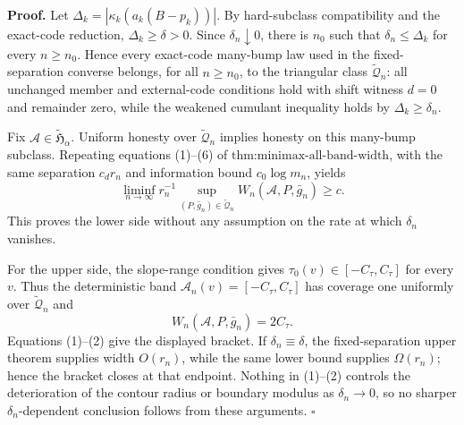 \textbf{Proof.}
Let \(\Delta_k=|\kappa_k(a_k(B-p_k))|\). By hard-subclass compatibility and the exact-code reduction, \(\Delta_k\ge\delta>0\). Since \(\delta_n\downarrow0\), there is \(n_0\) such that \(\delta_n\le\Delta_k\) for every \(n\ge n_0\). Hence every exact-code many-bump law used in the fixed-separation converse belongs, for all \(n\ge n_0\), to the triangular class \(\widetilde{\mathcal Q}_n\): all unchanged member and external-code conditions hold with shift witness \(d=0\) and remainder zero, while the weakened cumulant inequality holds by \(\Delta_k\ge\delta_n\).

Fix \(\mathcal A\in\widetilde{\mathfrak H}_\alpha\). Uniform honesty over \(\widetilde{\mathcal Q}_n\) implies honesty on this many-bump subclass. Repeating equations (1)--(6) of \(\text{thm:minimax-all-band-width}\), with the same separation \(c_dr_n\) and information bound \(c_0\log m_n\), yields
\[
 \liminf_{n\to\infty}r_n^{-1}
 \sup_{(P,\bar g_n)\in\widetilde{\mathcal Q}_n}
 W_n(\mathcal A,P,\bar g_n)\ge c. \tag{1}
\]
This proves the lower side without any assumption on the rate at which \(\delta_n\) vanishes.

For the upper side, the slope-range condition gives \(\tau_0(v)\in[-C_\tau,C_\tau]\) for every \(v\). Thus the deterministic band \(\mathcal A_n(v)=[-C_\tau,C_\tau]\) has coverage one uniformly over \(\widetilde{\mathcal Q}_n\) and
\[
 W_n(\mathcal A,P,\bar g_n)=2C_\tau. \tag{2}
\]
Equations (1)--(2) give the displayed bracket. If \(\delta_n\equiv\delta\), the fixed-separation upper theorem supplies width \(O(r_n)\), while the same lower bound supplies \(\Omega(r_n)\); hence the bracket closes at that endpoint. Nothing in (1)--(2) controls the deterioration of the contour radius or boundary modulus as \(\delta_n\to0\), so no sharper \(\delta_n\)-dependent conclusion follows from these arguments. \(\square\)